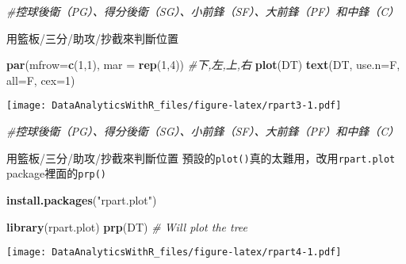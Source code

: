 \documentclass[]{book}
\newenvironment{Shaded}{\begin{snugshade}}{\end{snugshade}}
\newcommand{\KeywordTok}[1]{\textcolor[rgb]{0.13,0.29,0.53}{\textbf{{#1}}}}
\newcommand{\DataTypeTok}[1]{\textcolor[rgb]{0.13,0.29,0.53}{{#1}}}
\newcommand{\DecValTok}[1]{\textcolor[rgb]{0.00,0.00,0.81}{{#1}}}
\newcommand{\StringTok}[1]{\textcolor[rgb]{0.31,0.60,0.02}{{#1}}}
\newcommand{\CommentTok}[1]{\textcolor[rgb]{0.56,0.35,0.01}{\textit{{#1}}}}
\newcommand{\NormalTok}[1]{{#1}}
\begin{document}
\begin{Shaded}
\begin{Highlighting}[]
\CommentTok{#控球後衛（PG）、得分後衛（SG）、小前鋒（SF）、大前鋒（PF）和中鋒（C）}
\end{Highlighting}
\end{Shaded}

用籃板/三分/助攻/抄截來判斷位置

\begin{Shaded}
\begin{Highlighting}[]
\KeywordTok{par}\NormalTok{(}\DataTypeTok{mfrow=}\KeywordTok{c}\NormalTok{(}\DecValTok{1}\NormalTok{,}\DecValTok{1}\NormalTok{), }\DataTypeTok{mar =} \KeywordTok{rep}\NormalTok{(}\DecValTok{1}\NormalTok{,}\DecValTok{4}\NormalTok{)) }\CommentTok{#下,左,上,右}
\KeywordTok{plot}\NormalTok{(DT)}
\KeywordTok{text}\NormalTok{(DT, }\DataTypeTok{use.n=}\NormalTok{F, }\DataTypeTok{all=}\NormalTok{F, }\DataTypeTok{cex=}\DecValTok{1}\NormalTok{)}
\end{Highlighting}
\end{Shaded}

\texttt{[image: DataAnalyticsWithR\_files/figure-latex/rpart3-1.pdf]}

\begin{Shaded}
\begin{Highlighting}[]
\CommentTok{#控球後衛（PG）、得分後衛（SG）、小前鋒（SF）、大前鋒（PF）和中鋒（C）}
\end{Highlighting}
\end{Shaded}

用籃板/三分/助攻/抄截來判斷位置
預設的\texttt{plot()}真的太難用，改用\texttt{rpart.plot}
package裡面的\texttt{prp()}

\begin{Shaded}
\begin{Highlighting}[]
\KeywordTok{install.packages}\NormalTok{(}\StringTok{"rpart.plot"}\NormalTok{)}
\end{Highlighting}
\end{Shaded}

\begin{Shaded}
\begin{Highlighting}[]
\KeywordTok{library}\NormalTok{(rpart.plot)}
\KeywordTok{prp}\NormalTok{(DT)                 }\CommentTok{# Will plot the tree}
\end{Highlighting}
\end{Shaded}

\texttt{[image: DataAnalyticsWithR\_files/figure-latex/rpart4-1.pdf]}
\end{document}
